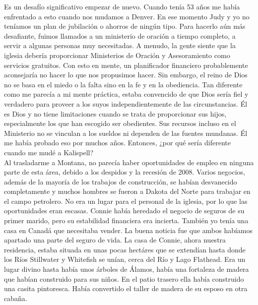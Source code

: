 \documentclass[twoside, 12pt]{book}
\begin{document}
Es un desafío significativo empezar de nuevo. Cuando tenía 53 años me había enfrentado a esto cuando nos mudamos a Denver. En ese momento Judy y yo no teníamos un plan de jubilación o ahorros de ningún tipo. Para hacerlo aún más desafiante, fuimos llamados a un ministerio de oración a tiempo completo, a servir a algunas personas muy necesitadas. A menudo, la gente siente que la iglesia debería proporcionar Ministerios de Oración y Asesoramiento como servicios gratuitos. Con esto en mente, un planificador financiero probablemente aconsejaría no hacer lo que nos propusimos hacer. Sin embargo, el reino de Dios no se basa en el miedo o la falta sino en la fe y en la obediencia. Tan diferente como me parecía a mi mente práctica, estaba convencido de que Dios sería fiel y verdadero para proveer a los suyos independientemente de las circunstancias. Él es Dios y no tiene limitaciones cuando se trata de proporcionar sus hijos, especialmente los que han escogido ser obedientes. Sus recursos incluso en el Ministerio no se vinculan a los sueldos ni dependen de las fuentes mundanas.  Él me había probado eso por muchos años. Entonces, ¿por qué sería diferente cuando me mudé a Kalispell?\\

Al trasladarme a Montana, no parecía haber oportunidades de empleo en ninguna parte de esta área, debido a los despidos y la recesión de 2008. Varios negocios, además de la mayoría de los trabajos de construcción, se habían desvanecido completamente y muchos hombres se fueron a Dakota del Norte para trabajar en el campo petrolero. No era un lugar para el personal de la iglesia, por lo que las oportunidades eran escasas. Connie había heredado el negocio de seguros de su primer marido, pero su estabilidad financiera era incierta. También yo tenía una casa en Canadá que necesitaba vender. La buena noticia fue que ambos habíamos apartado una parte del seguro de vida. La casa de Connie, ahora nuestra residencia, estaba situada en unas pocas hectáres que se extendían hasta donde los Ríos Stillwater y Whitefish se unían, cerca del Río y Lago Flathead. Era un lugar divino hasta había unos árboles de Álamos, había una fortaleza de madera que habían construido para sus niños. En el patio trasero ella había construido una casita pintoresca. Había convertido el taller de madera de su esposo en otra cabaña.\\
\end{document}
